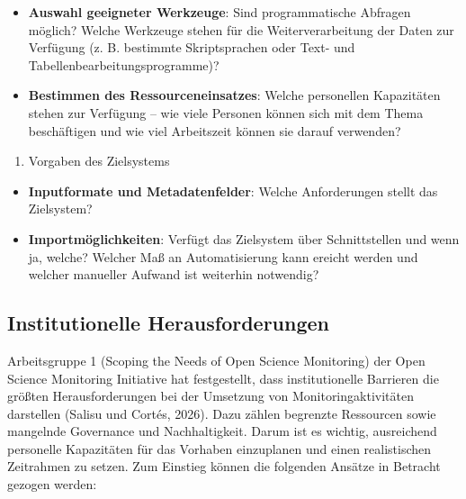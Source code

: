 \documentclass[
  ngerman,
  letterpaper,
  DIV=11]{scrreprt}
\providecommand{\tightlist}{%
  \setlength{\itemsep}{0pt}\setlength{\parskip}{0pt}}
\begin{document}
\begin{itemize}
\tightlist
\item
  \textbf{Auswahl geeigneter Werkzeuge}: Sind programmatische Abfragen
  möglich? Welche Werkzeuge stehen für die Weiterverarbeitung der Daten
  zur Verfügung (z. B. bestimmte Skriptsprachen oder Text- und
  Tabellenbearbeitungsprogramme)?
\item
  \textbf{Bestimmen des Ressourceneinsatzes}: Welche personellen
  Kapazitäten stehen zur Verfügung -- wie viele Personen können sich mit
  dem Thema beschäftigen und wie viel Arbeitszeit können sie darauf
  verwenden?
\end{itemize}

\begin{enumerate}
\def\labelenumi{\arabic{enumi}.}
\setcounter{enumi}{2}
\tightlist
\item
  Vorgaben des Zielsystems
\end{enumerate}

\begin{itemize}
\tightlist
\item
  \textbf{Inputformate und Metadatenfelder}: Welche Anforderungen stellt
  das Zielsystem?
\item
  \textbf{Importmöglichkeiten}: Verfügt das Zielsystem über
  Schnittstellen und wenn ja, welche? Welcher Maß an Automatisierung
  kann ereicht werden und welcher manueller Aufwand ist weiterhin
  notwendig?
\end{itemize}

\subsection{Institutionelle
Herausforderungen}\label{institutionelle-herausforderungen}

Arbeitsgruppe 1 (Scoping the Needs of Open Science Monitoring) der Open
Science Monitoring Initiative hat festgestellt, dass institutionelle
Barrieren die größten Herausforderungen bei der Umsetzung von
Monitoringaktivitäten darstellen (Salisu und Cortés, 2026). Dazu zählen
begrenzte Ressourcen sowie mangelnde Governance und Nachhaltigkeit.
Darum ist es wichtig, ausreichend personelle Kapazitäten für das
Vorhaben einzuplanen und einen realistischen Zeitrahmen zu setzen. Zum
Einstieg können die folgenden Ansätze in Betracht gezogen werden:
\end{document}
